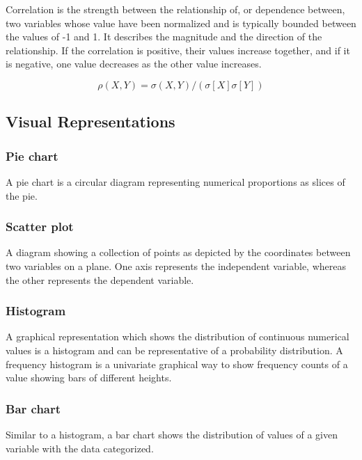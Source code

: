 \documentclass[11pt,]{article}
\begin{document}
Correlation is the strength between the relationship of, or dependence
between, two variables whose value have been normalized and is typically
bounded between the values of -1 and 1. It describes the magnitude and
the direction of the relationship. If the correlation is positive, their
values increase together, and if it is negative, one value decreases as
the other value increases.

\[ \rho(X, Y) = \sigma(X, Y) / (\sigma [X] \sigma [Y]) \]

\subsection{Visual Representations}\label{visual-representations}

\subsubsection{Pie chart}\label{pie-chart}

A pie chart is a circular diagram representing numerical proportions as
slices of the pie.

\subsubsection{Scatter plot}\label{scatter-plot}

A diagram showing a collection of points as depicted by the coordinates
between two variables on a plane. One axis represents the independent
variable, whereas the other represents the dependent variable.

\subsubsection{Histogram}\label{histogram}

A graphical representation which shows the distribution of continuous
numerical values is a histogram and can be representative of a
probability distribution. A frequency histogram is a univariate
graphical way to show frequency counts of a value showing bars of
different heights.

\subsubsection{Bar chart}\label{bar-chart}

Similar to a histogram, a bar chart shows the distribution of values of
a given variable with the data categorized.
\end{document}
